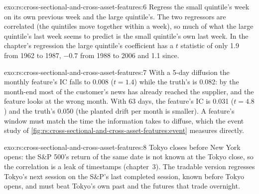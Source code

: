 \begin{solution}{exo:rs:cross-sectional-and-cross-asset-features:6}
Regress the small quintile's week on its own previous week and the large quintile's. The two regressors are correlated (the quintiles
move together within a week), so much of what the large quintile's last week seems to predict is the small quintile's own last week. In
the chapter's regression the large quintile's coefficient has a $t$ statistic of only 1.9 from 1962 to 1987, $-0.7$ from 1988 to 2006
and 1.1 since.
\end{solution}

\begin{solution}{exo:rs:cross-sectional-and-cross-asset-features:7}
With a 5-day diffusion the monthly feature's IC falls to 0.008 ($t = 1.4$) while the truth's is 0.082: by the month-end most of the
customer's news has already reached the supplier, and the feature looks at the wrong month. With 63 days, the feature's IC is 0.031
($t = 4.8$) and the truth's 0.050 (the planted drift per month is smaller). A feature's window must match the time the information takes
to diffuse, which the event study of \cref{fig:rs:cross-sectional-and-cross-asset-features:event} measures directly.
\end{solution}

\begin{solution}{exo:rs:cross-sectional-and-cross-asset-features:8}
Tokyo closes before New York opens: the S\&P 500's return of the same date is not known at the Tokyo close, so the correlation is a
leak of timestamps (chapter~3). The tradable version regresses Tokyo's next session on the S\&P's last completed session, known before
Tokyo opens, and must beat Tokyo's own past and the futures that trade overnight.
\end{solution}

